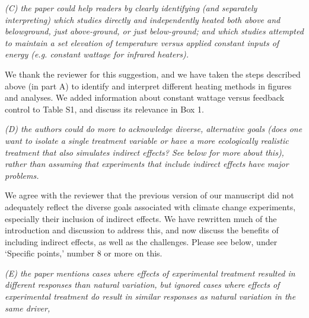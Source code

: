\documentclass[11pt,a4paper]{letter}
\begin{document}
\begin{letter}{}
\par \emph{(C) the paper could help readers by clearly identifying (and separately interpreting) which studies directly and independently heated both above and belowground, just above-ground, or just below-ground; and which studies attempted to maintain a set elevation of temperature versus applied constant inputs of energy (e.g. constant wattage for infrared heaters).}

\par We thank the reviewer for this suggestion, and we have taken the steps described above (in part A) to identify and interpret different heating methods in figures and analyses. We added information about constant wattage versus feedback control to Table S1, and discuss its relevance in Box 1. 

\par \emph{(D) the authors could do more to acknowledge diverse, alternative goals (does one want to isolate a single treatment variable or have a more ecologically realistic treatment that also simulates indirect effects? See below for more about this), rather than assuming that experiments that include indirect effects have major problems.}

\par We agree with the reviewer that the previous version of our manuscript did not adequately reflect the diverse goals associated with climate change experiments, especially their inclusion of indirect effects. We have rewritten much of the introduction and discussion to address this, and now discuss the benefits of including indirect effects, as well as the challenges. Please see below,  under `Specific points,' number 8 or more on this.


\par \emph{(E) the paper mentions cases where effects of experimental treatment resulted in different responses than natural variation, but ignored cases where effects of experimental treatment do result in similar responses as natural variation in the same driver,}


\end{letter}
\end{document}
